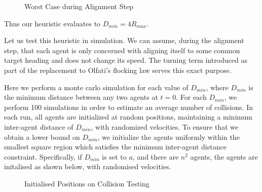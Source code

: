 \documentclass[letterpaper, 10 pt, conference]{ieeeconf}  %
\begin{document}
\begin{figure}[H]
\centering
{}
\caption{Worst Case during Alignment Step}
\end{figure}

Thus our heuristic evaluates to $D_{min} = 4R_{max}$.

Let us test this heuristic in simulation. We can assume, during the alignment step, that each agent is only concerned with aligning itself to some common target heading and does not change its speed. The turning term introduced as part of the replacement to Olfati's flocking law serves this exact purpose. 

Here we perform a monte carlo simulation for each value of $D_{min}$, where $D_{min}$ is the minimum distance between any two agents at $t=0$. For each $D_{min}$, we perform 100 simulations in order to estimate an average number of collisions. In each run, all agents are initialized at random positions, maintaining a minimum inter-agent distance of $D_{min}$, with randomized velocities. To ensure that we obtain a lower bound on $D_{min}$, we initialize the agents uniformly within the smallest square region which satisfies the minimum inter-agent distance constraint. Specifically, if $D_{min}$ is set to $a$, and there are $n^2$ agents, the agents are initalised as shown below, with randomised velocities.

\begin{figure}[H]
    \centering
    \caption{Initialised Positions on Collision Testing}
    \label{fig:enter-label}
\end{figure}
\end{document}
